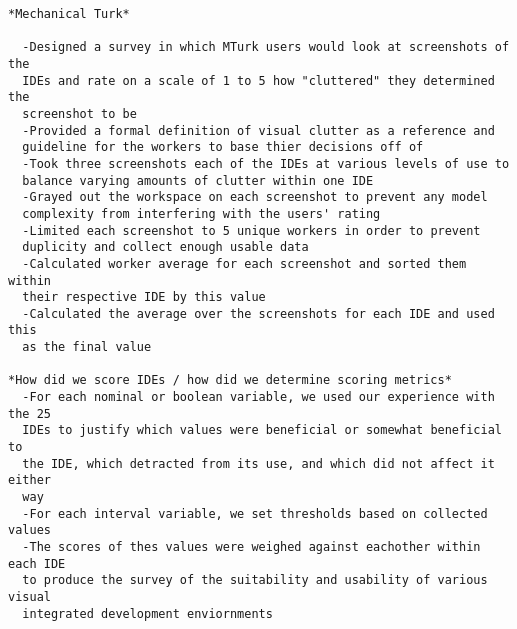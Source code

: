 \begin{verbatim}
*Mechanical Turk*

  -Designed a survey in which MTurk users would look at screenshots of the
  IDEs and rate on a scale of 1 to 5 how "cluttered" they determined the
  screenshot to be
  -Provided a formal definition of visual clutter as a reference and
  guideline for the workers to base thier decisions off of
  -Took three screenshots each of the IDEs at various levels of use to
  balance varying amounts of clutter within one IDE
  -Grayed out the workspace on each screenshot to prevent any model
  complexity from interfering with the users' rating
  -Limited each screenshot to 5 unique workers in order to prevent
  duplicity and collect enough usable data
  -Calculated worker average for each screenshot and sorted them within
  their respective IDE by this value
  -Calculated the average over the screenshots for each IDE and used this
  as the final value

*How did we score IDEs / how did we determine scoring metrics*
  -For each nominal or boolean variable, we used our experience with the 25
  IDEs to justify which values were beneficial or somewhat beneficial to
  the IDE, which detracted from its use, and which did not affect it either
  way
  -For each interval variable, we set thresholds based on collected values 
  -The scores of thes values were weighed against eachother within each IDE
  to produce the survey of the suitability and usability of various visual
  integrated development enviornments
\end{verbatim}
